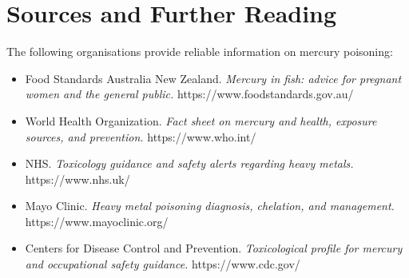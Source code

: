 \section*{Sources and Further Reading}
The following organisations provide reliable information on mercury poisoning:

\begin{itemize}
    \item Food Standards Australia New Zealand. \textit{Mercury in fish: advice for pregnant women and the general public.} https://www.foodstandards.gov.au/
    \item World Health Organization. \textit{Fact sheet on mercury and health, exposure sources, and prevention.} https://www.who.int/
    \item NHS. \textit{Toxicology guidance and safety alerts regarding heavy metals.} https://www.nhs.uk/
    \item Mayo Clinic. \textit{Heavy metal poisoning diagnosis, chelation, and management.} https://www.mayoclinic.org/
    \item Centers for Disease Control and Prevention. \textit{Toxicological profile for mercury and occupational safety guidance.} https://www.cdc.gov/
\end{itemize}

